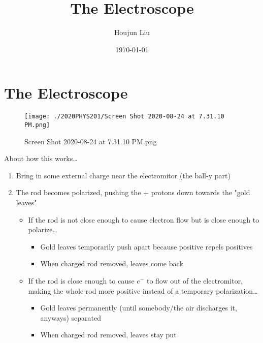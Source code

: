 \documentclass[letterpaper]{article}
\author{Houjun Liu}
\date{\today}
\title{The Electroscope}
\renewcommand\maketitle{}
\begin{document}
\maketitle


\section{The Electroscope}
\label{sec:orgc8b83f6}
\begin{figure}[htbp]
\centering
\texttt{[image: ./2020PHYS201/Screen Shot 2020-08-24 at 7.31.10 PM.png]}
\caption{Screen Shot 2020-08-24 at 7.31.10 PM.png}
\end{figure}

About how this works\ldots{}

\begin{enumerate}
\item Bring in some external charge near the electromitor (the ball-y part)
\item The rod becomes polarized, pushing the \(+\) protons down towards the
"gold leaves"

\begin{itemize}
\item If the rod is not close enough to cause electron flow but is close
enough to polarize\ldots{}

\begin{itemize}
\item Gold leaves temporarily push apart because positive repels
positives
\item When charged rod removed, leaves come back
\end{itemize}

\item If the rod is close enough to cause \(e^-\) to flow out of the
electromitor, making the whole rod more positive instead of a
temporary polarization\ldots{}

\begin{itemize}
\item Gold leaves permanently (until somebody/the air discharges it,
anyways) separated
\item When charged rod removed, leaves stay put
\end{itemize}
\end{itemize}
\end{enumerate}
\end{document}
